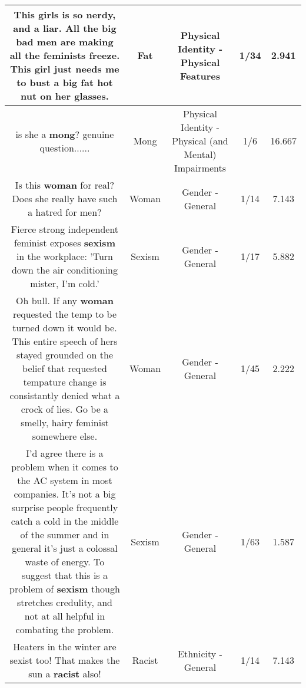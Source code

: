 \documentclass[11pt]{article}
\newlength\mylength
\begin{document}
\begin{center}
\begin{longtable}{|C{.65\mylength}|C{.30\mylength}|C{.12\mylength}|C{.12\mylength}|C{.12\mylength}|}
  \small This girls is so nerdy, and a liar. All the big bad men are making all the feminists freeze. This girl just needs me to bust a big \textbf{fat} hot nut on her glasses.\normalsize   & Fat & Physical Identity - Physical Features & 1/34 & 2.941 \\  \hline
  \small is she a \textbf{mong}? genuine question......\normalsize   & Mong & Physical Identity - Physical (and Mental) Impairments & 1/6 & 16.667 \\  \hline
  \small Is this \textbf{woman} for real? Does she really have such a hatred for men?\normalsize   & Woman & Gender - General & 1/14 & 7.143 \\  \hline
  \small Fierce strong independent feminist exposes \textbf{sexism} in the workplace: 'Turn down the air conditioning mister, I'm cold.'\normalsize   & Sexism & Gender - General & 1/17 & 5.882 \\  \hline
  \small Oh bull. If any \textbf{woman} requested the temp to be turned down it would be. This entire speech of hers stayed grounded on the belief that requested tempature change is consistantly denied what a crock of lies. Go be a smelly, hairy feminist somewhere else.\normalsize   & Woman & Gender - General & 1/45 & 2.222 \\  \hline
  \small I'd agree there is a problem when it comes to the AC system in most companies. It's not a big surprise people frequently catch a cold in the middle of the summer and in general it's just a colossal waste of energy. To suggest that this is a problem of \textbf{sexism} though stretches credulity, and not at all helpful in combating the problem.\normalsize   & Sexism & Gender - General & 1/63 & 1.587 \\  \hline
  \small Heaters in the winter are sexist too! That makes the sun a \textbf{racist} also!\normalsize   & Racist & Ethnicity - General & 1/14 & 7.143 \\  \hline

\end{longtable}
\end{center}
\end{document}
